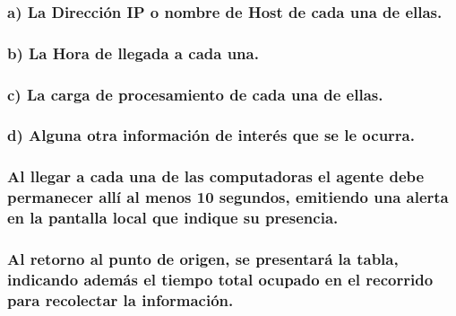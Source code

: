 \documentclass[11pt]{article}
\begin{document}
    \hypertarget{a-la-direcciuxf3n-ip-o-nombre-de-host-de-cada-una-de-ellas.}{%
\subsubsection{a) La Dirección IP o nombre de Host de cada una de
ellas.}\label{a-la-direcciuxf3n-ip-o-nombre-de-host-de-cada-una-de-ellas.}}

    \hypertarget{b-la-hora-de-llegada-a-cada-una.}{%
\subsubsection{b) La Hora de llegada a cada
una.}\label{b-la-hora-de-llegada-a-cada-una.}}

    \hypertarget{c-la-carga-de-procesamiento-de-cada-una-de-ellas.}{%
\subsubsection{c) La carga de procesamiento de cada una de
ellas.}\label{c-la-carga-de-procesamiento-de-cada-una-de-ellas.}}

    \hypertarget{d-alguna-otra-informaciuxf3n-de-interuxe9s-que-se-le-ocurra.}{%
\subsubsection{d) Alguna otra información de interés que se le
ocurra.}\label{d-alguna-otra-informaciuxf3n-de-interuxe9s-que-se-le-ocurra.}}

    \hypertarget{al-llegar-a-cada-una-de-las-computadoras-el-agente-debe-permanecer-alluxed-al-menos-10-segundos-emitiendo-una-alerta-en-la-pantalla-local-que-indique-su-presencia.}{%
\subsubsection{Al llegar a cada una de las computadoras el agente debe
permanecer allí al menos 10 segundos, emitiendo una alerta en la
pantalla local que indique su
presencia.}\label{al-llegar-a-cada-una-de-las-computadoras-el-agente-debe-permanecer-alluxed-al-menos-10-segundos-emitiendo-una-alerta-en-la-pantalla-local-que-indique-su-presencia.}}

    \hypertarget{al-retorno-al-punto-de-origen-se-presentaruxe1-la-tabla-indicando-ademuxe1s-el-tiempo-total-ocupado-en-el-recorrido-para-recolectar-la-informaciuxf3n.}{%
\subsubsection{Al retorno al punto de origen, se presentará la tabla,
indicando además el tiempo total ocupado en el recorrido para recolectar
la
información.}\label{al-retorno-al-punto-de-origen-se-presentaruxe1-la-tabla-indicando-ademuxe1s-el-tiempo-total-ocupado-en-el-recorrido-para-recolectar-la-informaciuxf3n.}}
\end{document}

